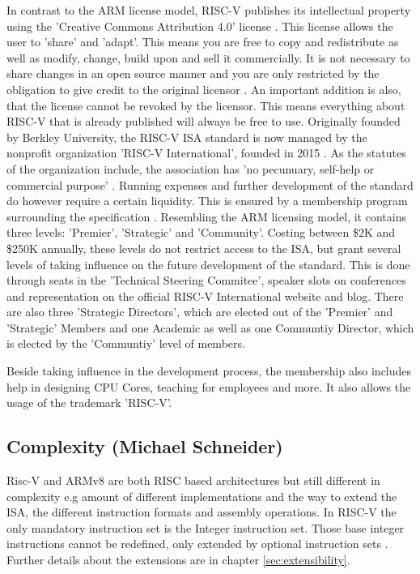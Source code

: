 \documentclass[conference]{IEEEtran}
\begin{document}
	In contrast to the ARM license model, RISC-V publishes its intellectual property using the 'Creative Commons Attribution 4.0' license \cite{Waterman2017}\cite{Waterman2017a}. This license allows the user to 'share' and 'adapt'. This means you are free to copy and redistribute as well as modify, change, build upon and sell it commercially. It is not necessary to share changes in an open source manner and you are only restricted by the obligation to give credit to the original licensor \cite{CC}. An important addition is also, that the license cannot be revoked by the licensor. This means everything about RISC-V that is already published will always be free to use.
	Originally founded by Berkley University, the RISC-V \gls{ISA} standard is now managed by the nonprofit organization 'RISC-V International', founded in 2015 \cite{RVIAbout}. As the statutes of the organization include, the association has 'no pecunuary, self-help or commercial purpose' \cite{RVIArt}. Running expenses and further development of the standard do however require a certain liquidity. This is ensured by a membership program surrounding the specification \cite{RVIMem}. Resembling the ARM licensing model, it contains three levels: 'Premier', 'Strategic' and 'Community'. Costing between \$2K and \$250K annually, these levels do not restrict access to the \gls{ISA}, but grant several levels of taking influence on the future development of the standard. This is done through seats in the 'Technical Steering Commitee', speaker slots on conferences and representation on the official RISC-V International website and blog. There are also three 'Strategic Directors', which are elected out of the 'Premier' and 'Strategic' Members and one Academic as well as one Communtiy Director, which is elected by the 'Communtiy' level of members. \cite{RVIAss}

	Beside taking influence in the development process, the membership also includes help in designing \gls{CPU} Cores, teaching for employees and more. It also allows the usage of the trademark 'RISC-V'.

	\subsection{Complexity (Michael Schneider)}
	\label{complexity}
	Risc-V and ARMv8 are both \gls{RISC} based architectures but still different in complexity e.g amount of different implementations and the way to extend the \gls{ISA}, the different instruction formats and assembly operations. In RISC-V the only mandatory instruction set is the Integer instruction set. Those base integer instructions cannot be redefined, only extended by optional instruction sets \cite[page 3f]{Waterman2017}. Further details about the extensions are in chapter \ref{sec:extensibility}.
	
\end{document}
